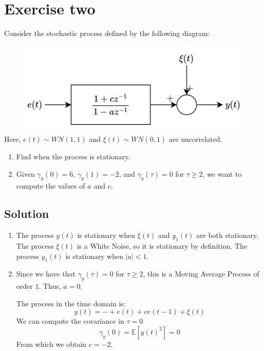 \section{Exercise two}

Consider the stochastic process defined by the following diagram:
\begin{figure}[H]
    \centering
    \includegraphics[width=0.5\linewidth]{images/block1.png}
\end{figure}
Here, $e(t) \sim WN(1,1)$ and $\xi(t) \sim WN(0,1)$ are uncorrelated.
\begin{enumerate}
    \item Find when the process is stationary. 
    \item Given $\gamma_y(0)=6$, $\gamma_y(1)=-2$, and $\gamma_y(\tau)=0$ for $\tau \geq 2$, we want to compute the values of $a$ and $c$. 
\end{enumerate}

\subsection{Solution}
\begin{enumerate}
    \item The process $y(t)$ is stationary when $\xi(t)$ and $y_1(t)$ are both stationary. 
        The process $\xi(t)$ is a White Noise, so it is stationary by definition. 
        The process $y_1(t)$ is stationary when $\left\lvert a \right\rvert<1$.
    \item Since we have that $\gamma_y(\tau)=0$ for $\tau \geq 2$, this is a Moving Average Process of order $1$. 
        Thus, $a=0$. 

        The process in the time domain is: 
        \[y(t)=-+e(t)+ce(t-1)+\xi(t)\]
        We can compute the covariance in $\tau=0$
        \[\gamma_y(0)=\mathbb{E}\left[ y(t)^2 \right]=0\]
        From which we obtain $c=-2$. 
\end{enumerate}
